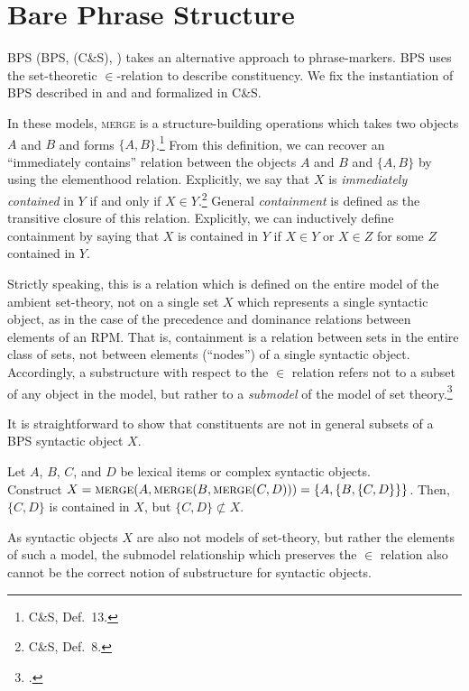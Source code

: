\documentclass[output=paper]{langsci/langscibook}
\begin{document}
\section{Bare Phrase Structure}

\glsdesc{BPS} (\gls{BPS}, \citealt{ColSta2016}
(C\&S\nocite{ColSta2016}), \citealt{Chomsky2000,fukui2011merge}) takes an
alternative approach to phrase-markers. \gls{BPS} uses the set-theoretic
$\in$-relation to describe constituency. We fix the instantiation of \gls{BPS}
described in \cite{Chomsky2000} and \cite{Chomsky2008} and formalized in
C\&S\nocite{ColSta2016}.

In these models, \textsc{merge} is a structure-building operations which takes
two objects $A$ and $B$ and forms $\{A,B\}$.\footnote{C\&S\nocite{ColSta2016},
Def.\ 13.} From this definition, we can recover an ``immediately contains''
relation between the objects $A$ and $B$ and $\{A,B\}$ by using the elementhood
relation.  Explicitly, we say that $X$ is \emph{immediately contained} in $Y$
if and only if $X\in Y$.\footnote{C\&S\nocite{ColSta2016}, Def.\ 8.} General
\emph{containment} is defined as the transitive closure of this relation.
Explicitly, we can inductively define containment by saying that $X$ is
contained in $Y$ if $X\in Y$ or $X\in Z$ for some $Z$ contained in $Y$.

Strictly speaking, this is a relation which is defined on the entire model of
the ambient set-theory, not on a single set $X$ which represents a single
syntactic object, as in the case of the precedence and dominance relations
between elements of an \gls{RPM}. That is,
containment is a relation between sets in the entire class of sets, not between
elements (``nodes'') of a single syntactic object. Accordingly, a substructure
with respect to the $\in$ relation refers not to a subset of any object in the
model, but rather to a \emph{submodel} of the model of set
theory.\footnote{\citet{chang1990model}.}

It is straightforward to show that constituents are not in general subsets of a
\gls{BPS} syntactic object $X$.

\ea\label{ex:key:33.23}Let $A$, $B$, $C$, and $D$ be lexical items or complex
syntactic objects.\\
    Construct
    $X=\textsc{merge}(A,\textsc{merge}(B,\textsc{merge}(C,D)))=\{A,\{B,\{C,D\}\}\}$.
    Then, $\{C,D\}$ is contained in $X$, but $\{C,D\}\not\subset X$.
\z

As syntactic objects $X$ are also not models of set-theory, but rather the
elements of such a model, the submodel relationship which preserves the $\in$
relation also cannot be the correct notion of substructure for syntactic
objects.
\end{document}
